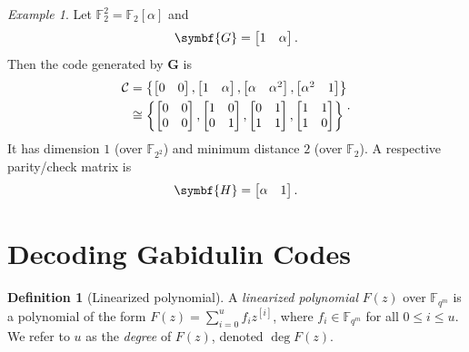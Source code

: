\documentclass[version=last, paper=A4, parskip=half, oneside,%
toc=bibliography, toc=listof, listof=leveldown]{scrbook}
\theoremstyle{plain}
\theoremstyle{definition}
\newtheorem{definition}{Definition}
\theoremstyle{remark}
\newtheorem*{example}{Example}
\newcommand*{\mat}{\symbf}
\newcommand*{\FF}{\ensuremath{\mathbb{F}}}
\begin{document}
\begin{example}
  Let \(\FF_2^2 = \FF_2[\alpha]\) and
  \[
    \mat{G} = \begin{bmatrix} 1 & \alpha \end{bmatrix}\text.
  \]
  Then the code generated by \(\mat{G}\) is
  \[
    \begin{aligned}
      \mathcal{C} &=
      \left\{
        \begin{bmatrix} 0 & 0 \end{bmatrix},
        \begin{bmatrix} 1 & \alpha \end{bmatrix},
        \begin{bmatrix} \alpha & \alpha^2 \end{bmatrix},
        \begin{bmatrix} \alpha^2 & 1 \end{bmatrix}
      \right\} \\
      &\cong
      \left\{
        \begin{bmatrix} 0 & 0 \\ 0 & 0 \end{bmatrix},
        \begin{bmatrix} 1 & 0 \\ 0 & 1 \end{bmatrix},
        \begin{bmatrix} 0 & 1 \\ 1 & 1 \end{bmatrix},
        \begin{bmatrix} 1 & 1 \\ 1 & 0 \end{bmatrix}
      \right\}
    \end{aligned}\text.
  \]
  It has dimension \(1\) (over \(\FF_{2^2}\)) and minimum distance \(2\) (over
  \(\FF_2\)).  A respective parity\-/check matrix is
  \[
    \mat{H} = \begin{bmatrix} \alpha & 1 \end{bmatrix}\text.
  \]
\end{example}

\section{Decoding Gabidulin Codes}\label{sec:gabidulin-code-decoding}

\begin{definition}[Linearized polynomial]
  A \emph{linearized polynomial} \(F(z)\) over \(\FF_{q^m}\) is a polynomial of
  the form \(F(z) = \sum_{i = 0}^u f_i z^{[i]}\), where \(f_i \in \FF_{q^m}\)
  for all \(0 \le i \le u\).  We refer to \(u\) as the \emph{degree} of
  \(F(z)\), denoted \(\deg F(z)\).
\end{definition}
\end{document}
